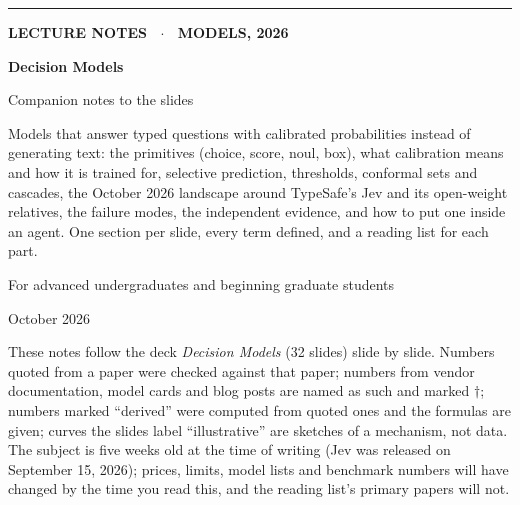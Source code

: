 \documentclass[11pt,letterpaper]{article}
\begin{document}
\begin{titlepage}
\thispagestyle{empty}
\vspace*{2.5cm}
{\color{outc}\rule{3cm}{3pt}}\par\vspace{0.6cm}
{\sffamily\bfseries\color{muted}\large LECTURE NOTES \ $\cdot$ \ MODELS, 2026\par}
\vspace{0.4cm}
{\sffamily\bfseries\fontsize{34}{38}\selectfont\color{ink} Decision Models\par}
\vspace{0.3cm}
{\sffamily\fontsize{18}{22}\selectfont\color{ink} Companion notes to the slides\par}
\vspace{1.2cm}
{\large\color{muted}\parbox{0.82\textwidth}{Models that answer typed questions with calibrated probabilities instead of generating text: the primitives (choice, score, noul, box), what calibration means and how it is trained for, selective prediction, thresholds, conformal sets and cascades, the October 2026 landscape around TypeSafe's Jev and its open-weight relatives, the failure modes, the independent evidence, and how to put one inside an agent. One section per slide, every term defined, and a reading list for each part.}\par}
\vspace{1.5cm}
{\color{muted}For advanced undergraduates and beginning graduate students\par}
\vspace{0.3cm}
{\color{muted}October 2026\par}
\vfill
{\small\color{muted}\parbox{0.9\textwidth}{These notes follow the deck \textit{Decision Models} (32 slides) slide by slide. Numbers quoted from a paper were checked against that paper; numbers from vendor documentation, model cards and blog posts are named as such and marked $\dagger$; numbers marked ``derived'' were computed from quoted ones and the formulas are given; curves the slides label ``illustrative'' are sketches of a mechanism, not data. The subject is five weeks old at the time of writing (Jev was released on September 15, 2026); prices, limits, model lists and benchmark numbers will have changed by the time you read this, and the reading list's primary papers will not.}\par}
\end{titlepage}

\tableofcontents
\clearpage
\end{document}
